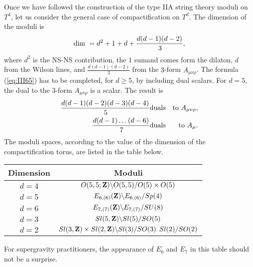 Once we have followed the construction of the type IIA string
theory moduli on $T^4$, let us consider the general case of 
compactification on $T^d$. The dimension of the moduli is 
\begin{equation}
\hbox {dim } = d^2 +1+d+ \frac {d(d-1)(d-2)}{3\!},
\label{eq:III65}
\end{equation}
where $d^2$ is the NS-NS contribution, the $1$ sumand comes form
the dilaton, $d$ from the Wilson lines, and $\frac
{d(d-1)(d-2)}{3\!}$ from the $3$-form $A_{\mu \nu \rho}$. The
formula (\ref{eq:III65}) has to be completed, for $d \geq 5$, by
including dual scalars. For $d=5$, the dual to the $3$-form
$A_{\mu \nu \rho}$ is a scalar. The result is 
\begin{eqnarray}
\frac {d(d-1)(d-2)(d-3)(d-4)}{5\!} & \hbox {duals} & \hbox {to  }A_{\mu
\nu \rho}, \nonumber \\
\frac {d(d-1)\ldots(d-6)}{7\!} & \hbox {duals} & \hbox {to  } A_{\mu}.
\label{eq:III66}
\end{eqnarray}
The moduli spaces, according to the value of the dimension of the
compactification torus, are listed in the table below.


\begin{center}

\begin{tabular}{|c|c|}     \hline\hline
	 {\bf Dimension  }      & {\bf Moduli}    \\ \hline
	 $d=4$       & $O(5,5;{\bf Z}) \backslash O(5,5) / O(5) \times O(5)$    \\
	 $d=5$       & $E_{6,(6)}({\bf Z}) \backslash E_{6,(6)} / Sp(4)$       \\
	 $d=6$       & $E_{7,(7)}({\bf Z}) \backslash E_{7,(7)} / SU(8)$       \\
	 $d=3$       & $Sl(5,{\bf Z}) \backslash Sl(5) / SO(5)$       \\
	 $d=2$       & $Sl(3,{\bf Z}) \times Sl(2,{\bf Z})
\backslash Sl(3) / SO(3) \: \: Sl(2) / SO(2)$       \\ \hline
\hline
\end{tabular}
\label{tab:modulis}
\end{center}
  
For supergravity practitioners, the appearance of $E_6$ and
$E_7$ in this table should not be a surprise. 
  
